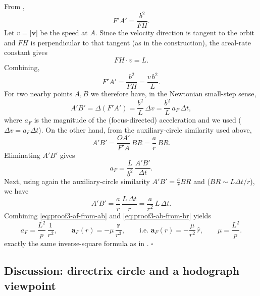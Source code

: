 From ,
\begin{equation}
  F'\!A'=\frac{b^2}{FH}.
\end{equation}
Let $v=\lvert \mathbf v\rvert$ be the speed at $A$. Since the velocity direction is tangent to the orbit and $FH$ is perpendicular to that tangent (as in the construction), the areal-rate constant gives
\begin{equation}
  FH\cdot v = L.
\end{equation}
Combining,
\begin{equation}
  F'\!A'=\frac{b^2}{FH}=\frac{v\,b^2}{L}.
\end{equation}
For two nearby points $A,B$ we therefore have, in the Newtonian small-step sense,
\begin{equation}
  A'B'=\Delta(F'\!A')=\frac{b^2}{L}\,\Delta v
  =\frac{b^2}{L}\,a_F\,\Delta t,
\end{equation}
where $a_F$ is the magnitude of the (focus-directed) acceleration and we used  ($\Delta v=a_F\Delta t$).
On the other hand, from the auxiliary-circle similarity used above,
\begin{equation}
  A'B'=\frac{OA'}{F'\!A}\,BR=\frac{a}{r}\,BR.
\end{equation}
Eliminating $A'B'$ gives
\begin{equation}
  a_F=\frac{L}{b^2}\,\frac{A'B'}{\Delta t}.
\label{eq:proof3-af-from-ab}
\end{equation}
Next, using again the auxiliary-circle similarity $A'B'=\frac{a}{r}BR$ and  ($BR\sim L\Delta t/r$), we have
\begin{equation}
  A'B'=\frac{a}{r}\,\frac{L\,\Delta t}{r}
  =\frac{a}{r^2}\,L\,\Delta t.
\label{eq:proof3-ab-from-br}
\end{equation}
Combining \eqref{eq:proof3-af-from-ab} and \eqref{eq:proof3-ab-from-br} yields
\begin{equation}
  a_F=\frac{L^2}{p}\,\frac{1}{r^2},
  \qquad
  \mathbf a_F(r)=-\mu\,\frac{\mathbf r}{r^3},
  \qquad
  \text{i.e. }\mathbf a_F(r)=-\frac{\mu}{r^2}\,\hat r,
  \qquad
  \mu=\frac{L^2}{p}.
\end{equation}
exactly the same inverse-square formula as in .
\hfill$\square$

\subsection{Discussion: directrix circle and a hodograph viewpoint}
\label{subsec:sec6-discussion}

